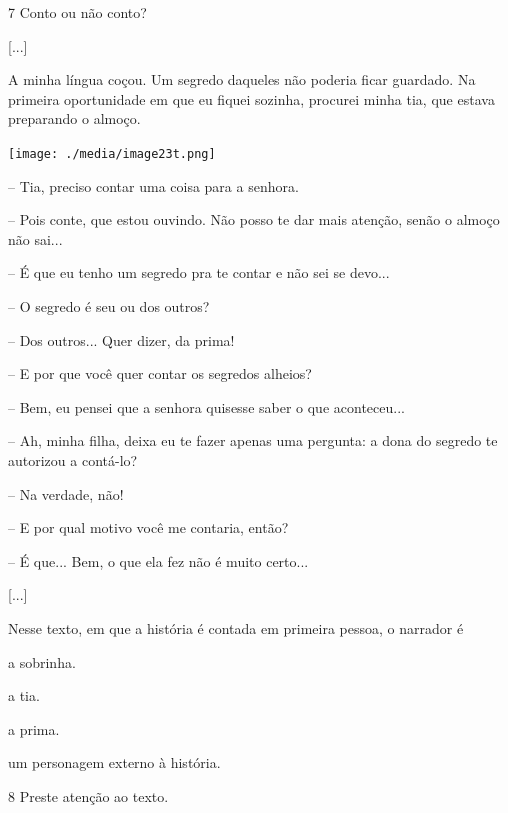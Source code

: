 \num{7} Conto ou não conto?

\begin{myquote}
{[}...{]}

A minha língua coçou. Um segredo daqueles não poderia ficar guardado. Na
primeira oportunidade em que eu fiquei sozinha, procurei minha tia, que
estava preparando o almoço.

\begin{center}
\texttt{[image: ./media/image23t.png]}
\end{center}

-- Tia, preciso contar uma coisa para a senhora.

-- Pois conte, que estou ouvindo. Não posso te dar mais atenção, senão o
almoço não sai...

-- É que eu tenho um segredo pra te contar e não sei se devo...

-- O segredo é seu ou dos outros?

-- Dos outros... Quer dizer, da prima!

-- E por que você quer contar os segredos alheios?

-- Bem, eu pensei que a senhora quisesse saber o que aconteceu...

-- Ah, minha filha, deixa eu te fazer apenas uma pergunta: a dona do
segredo te autorizou a contá-lo?

-- Na verdade, não!

-- E por qual motivo você me contaria, então?

-- É que... Bem, o que ela fez não é muito certo...

{[}...{]}

\end{myquote}

Nesse texto, em que a história é contada em primeira pessoa, o narrador
é

\begin{escolha}
\item a sobrinha.

\item a tia.

\item a prima.

\item um personagem externo à história.
\end{escolha}


\num{8} Preste atenção ao texto.

